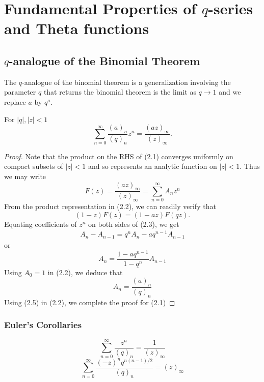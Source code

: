 \chapter{Fundamental Properties of $q$-series and Theta functions}

\section{$q$-analogue of the Binomial Theorem}

The $q$-analogue of the binomial theorem is a generalization involving the parameter $q$ that returns the binomial theorem is the limit as $q \to 1$ and we replace $a$ by $q^a$.
\begin{theorem}
For  $|q|, |z| < 1$
\begin{equation}
    \sum_{n = 0}^{\infty} \frac{(a)_n}{(q)_n}z^n = \frac{(az)_\infty}{(z)_\infty}.
\end{equation}
\end{theorem}

\begin{proof}
Note that the product on the RHS of (2.1) converges uniformly on compact subsets of $|z| < 1$ and so represents an analytic function on $|z| < 1$. Thus we may write
\begin{equation}
    F(z) = \frac{(az)_\infty}{(z)_\infty} = \sum_{n = 0}^\infty A_n z^n
\end{equation}
From the product representation in (2.2), we can readily verify that
\begin{equation}
    (1-z)F(z) = (1-az)F(qz).
\end{equation}
Equating coefficients of $z^n$ on both sides of (2.3), we get
\begin{align*}
    A_n - A_{n-1} = q^n A_n - aq^{n-1}A_{n-1}
\end{align*}
or
\begin{equation}
    A_n = \frac{1-aq^{n-1}}{1-q^n} A_{n-1}
\end{equation}
Using $A_0 = 1$ in (2.2), we deduce that
\begin{equation}
    A_n = \frac{(a)_n}{(q)_n}
\end{equation}
Using (2.5) in (2.2), we complete the proof for (2.1)
\end{proof}

\subsection{Euler's Corollaries}
\begin{equation}
    \sum_{n = 0}^{\infty} \frac{z^n}{(q)_n} = \frac{1}{(z)_\infty}
\end{equation}
\begin{equation}
    \sum_{n = 0}^{\infty} \frac{(-z)^nq^{n(n-1)/2}}{(q)_n} = (z)_\infty
\end{equation}


